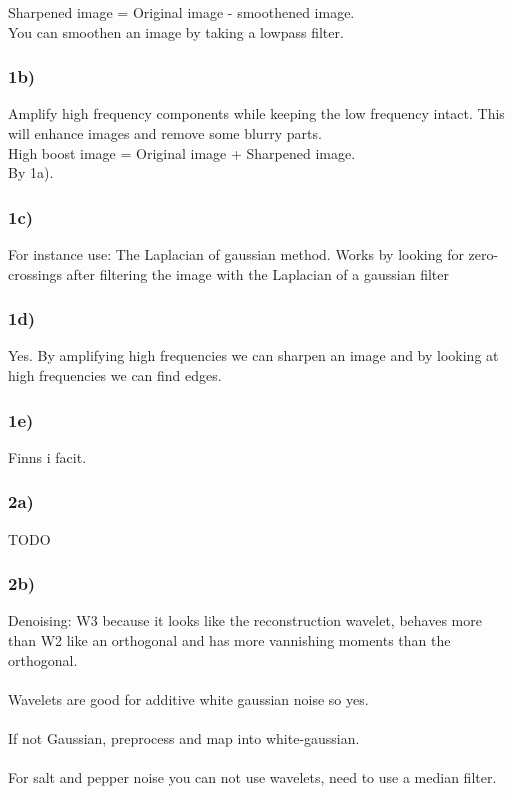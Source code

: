 \documentclass[12pt]{article}
\begin{document}
	    Sharpened image = Original image - smoothened image.\\
	    You can smoothen an image by taking a lowpass filter. 
	
	\subsubsection*{1b)}
	
	    Amplify high frequency components while keeping the low frequency intact. This will enhance images and remove some blurry parts. \\
	    High boost image = Original image + Sharpened image. 
	    \\By 1a).
	
	\subsubsection*{1c)}
	
	    For instance use: The Laplacian of gaussian method. Works by looking for zero-crossings after filtering the image with the Laplacian of a gaussian filter
	
	\subsubsection*{1d)}
	
	    Yes. By amplifying high frequencies we can sharpen an image and by looking at high frequencies we can find edges.
	
	\subsubsection*{1e)}
	
	    Finns i facit.
	    
	\subsubsection*{2a)}
	
	    TODO
	    
	\subsubsection*{2b)}
	    Denoising: W3 because it looks like the reconstruction wavelet, behaves more than W2 like an orthogonal 
	    and has more vannishing moments than the orthogonal.\\
	    \\
	    Wavelets are good for additive white gaussian noise so yes.\\
	    \\
	    If not Gaussian, preprocess and map into white-gaussian.\\
	    \\
	    For salt and pepper noise you can not use wavelets, need to use a median filter.
	    
\end{document}
